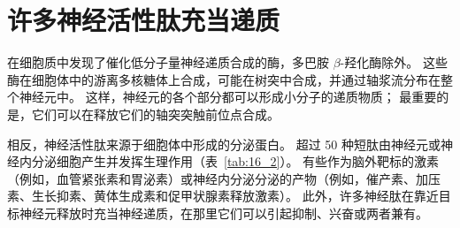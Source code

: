 \section{许多神经活性肽充当递质}

在细胞质中发现了催化低分子量神经递质合成的酶，多巴胺 $\beta$-羟化酶除外。
这些酶在细胞体中的游离多核糖体上合成，可能在树突中合成，并通过轴浆流分布在整个神经元中。
这样，神经元的各个部分都可以形成小分子的递质物质；
最重要的是，它们可以在释放它们的轴突突触前位点合成。


相反，神经活性肽来源于细胞体中形成的分泌蛋白。
超过 50 种短肽由神经元或神经内分泌细胞产生并发挥生理作用（表~\ref{tab:16_2}）。
有些作为脑外靶标的激素（例如，血管紧张素和胃泌素）或神经内分泌分泌的产物（例如，催产素、加压素、生长抑素、黄体生成素和促甲状腺素释放激素）。
此外，许多神经肽在靠近目标神经元释放时充当神经递质，在那里它们可以引起抑制、兴奋或两者兼有。


